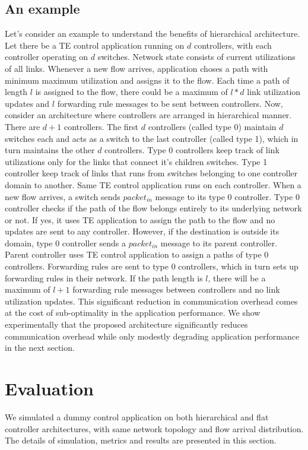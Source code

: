 \documentclass[10pt, twocolumn]{article}
\begin{document}
\subsection{An example}
\label{example}
Let's consider an example to understand the benefits of hierarchical architecture. Let there be a TE control application running on $d$ controllers, with each controller operating on $d$ switches. Network state consists of current utilizations of all links. Whenever a new flow arrives, application choses a path with minimum maximum utilization and assigns it to the flow. Each time a path of length $l$ is assigned to the flow, there could be a maximum of $l*d$ link utilization updates and $l$ forwarding rule messages to be sent between controllers. Now, consider an architecture where controllers are arranged in hierarchical manner. There are $d+1$ controllers. The first $d$ controllers (called type 0) maintain $d$ switches each and acts as a switch to the last controller (called type 1), which in turn maintains the other $d$ controllers. Type 0 controllers keep track of link utilizations only for the links that connect it's children switches. Type 1 controller keep track of links that runs from switches belonging to one controller domain to another. Same TE control application runs on each controller. When a new flow arrives, a switch sends $packet_{in}$ message to its type 0 controller. Type 0 controller checks if the path of the flow belongs entirely to its underlying network or not. If yes, it uses TE application to assign the path to the flow and no updates are sent to any controller. However, if the destination is outside its domain, type 0 controller sends a $packet_{in}$ message to its parent controller. Parent controller uses TE control application to assign a paths of type 0 controllers. Forwarding rules are sent to type 0 controllers, which in turn sets up forwarding rules in their network. If the path length is $l$, there will be a maximum of $l+1$ forwarding rule messages between controllers and no link utilization updates. This significant reduction in communication overhead comes at the cost of sub-optimality in the application performance. We show experimentally that the proposed architecture significantly reduces communication overhead while only modestly degrading application performance in the next section.

\section{Evaluation}
\label{sec:eval}
We simulated a dummy control application on both hierarchical and flat controller architectures, with same network topology and flow arrival distribution. The details of simulation, metrics and results are presented in this section.
\end{document}
